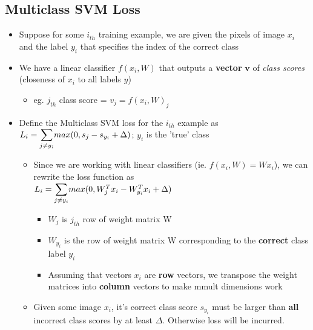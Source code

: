 \documentclass{article}
\begin{document}
\subsection{Multiclass SVM Loss}
\begin{itemize}
    \item Suppose for some $i_{th}$ training example, we are given the pixels of image $x_{i}$ and the label $y_{i}$ that specifies the index of the correct class
    \item We have a linear classifier $f(x_{i},W)$ that outputs a \textbf{vector} $\boldsymbol{v}$ of \textit{class scores} (closeness of $x_{i}$ to all labels $y$)
        \begin{itemize}
            \item eg. $j_{th}$ class score = $v_{j} = f(x_{i},W)_{j}$
        \end{itemize}
    \item Define the Multiclass SVM loss for the $i_{th}$ example as $L_{i} = \mathlarger{\sum\limits}_{j \neq y_{i}}max(0, s_{j}-s_{y_{i}} + \Delta)$; $y_{i}$ is the 'true' class
        \begin{itemize}
            \item Since we are working with linear classifiers (ie. $f(x_{i},W) = Wx_{i}$), we can rewrite the loss function as\\
                    $L_{i} = \mathlarger{\sum\limits}_{j \neq y_{i}}max(0, W_{j}^{T}x_{i} - W_{y_{i}}^{T}x_{i} + \Delta)$
                        \begin{itemize}
                            \item $W_{j}$ is $j_{th}$ row of weight matrix W
                            \item $W_{y_{i}}$ is the row of weight matrix W corresponding to the \textbf{correct} class label $y_{i}$
                            \item Assuming that vectors $x_{i}$ are \textbf{row} vectors, we transpose the weight matrices into \textbf{column} vectors to make mmult dimensions work
                        \end{itemize}
            \item Given some image $x_{i}$, it's correct class score $s_{y_{i}}$ must be larger than \textbf{all} incorrect class scores by at least $\Delta$. Otherwise loss will be incurred.
        \end{itemize}
\end{itemize}
\end{document}
